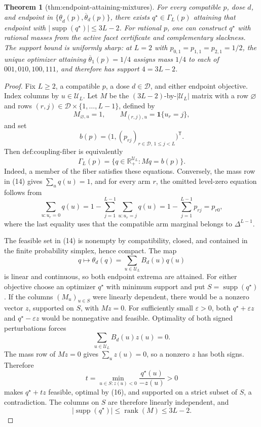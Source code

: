 \documentclass{article}
\newtheorem{theorem}{Theorem}
\begin{document}
\begin{theorem}[thm:endpoint-attaining-mixtures]\label{thm:endpoint-attaining-mixtures}
For every compatible \(p\), dose \(d\), and endpoint in \(\{\underline\theta_d(p),\overline\theta_d(p)\}\), there exists \(q^\star\in\Gamma_L(p)\) attaining that endpoint with \(|\operatorname{supp}(q^\star)|\le3L-2\). For rational \(p\), one can construct \(q^\star\) with rational masses from the active facet certificate and complementary slackness. The support bound is uniformly sharp: at \(L=2\) with \(p_{0,1}=p_{1,1}=p_{2,1}=1/2\), the unique optimizer attaining \(\overline\theta_1(p)=1/4\) assigns mass \(1/4\) to each of \(001,010,100,111\), and therefore has support \(4=3L-2\).
\end{theorem}
\begin{proof}
Fix \(L\geq2\), a compatible \(p\), a dose \(d\in\mathcal D\), and either endpoint objective.  Index columns by \(u\in\mathcal U_L\).  Let \(M\) be the \((3L-2)\)-by-\(|\mathcal U_L|\) matrix with a row \(\varnothing\) and rows \((r,j)\in\mathcal D\times\{1,\ldots,L-1\}\), defined by
\[
 M_{\varnothing,u}=1,
 \qquad
 M_{(r,j),u}=\mathbf 1\{u_r=j\},
\]
and set
\[
 b(p)=\bigl(1,(p_{rj})_{r\in\mathcal D,\,1\leq j<L}\bigr)^{\mathsf T}.
\]
Then \(\text{def:coupling-fiber}\) is equivalently
\[
 \Gamma_L(p)=\{q\in\mathbb R_+^{\mathcal U_L}:Mq=b(p)\}.                    \tag{14}
\]
Indeed, a member of the fiber satisfies these equations.  Conversely, the mass row in (14) gives \(\sum_uq(u)=1\), and for every arm \(r\), the omitted level-zero equation follows from
\[
 \sum_{u:u_r=0}q(u)
 =1-\sum_{j=1}^{L-1}\sum_{u:u_r=j}q(u)
 =1-\sum_{j=1}^{L-1}p_{rj}=p_{r0},                                         \tag{15}
\]
where the last equality uses that the compatible arm marginal belongs to \(\Delta^{L-1}\).

The feasible set in (14) is nonempty by compatibility, closed, and contained in the finite probability simplex, hence compact.  The map
\[
 q\longmapsto\theta_d(q)=\sum_{u\in\mathcal U_L}B_d(u)q(u)
\]
is linear and continuous, so both endpoint extrema are attained.  For either objective choose an optimizer \(q^\star\) with minimum support and put \(S=\operatorname{supp}(q^\star)\).  If the columns \((M_u)_{u\in S}\) were linearly dependent, there would be a nonzero vector \(z\), supported on \(S\), with \(Mz=0\).  For sufficiently small \(\varepsilon>0\), both \(q^\star+\varepsilon z\) and \(q^\star-\varepsilon z\) would be nonnegative and feasible.  Optimality of both signed perturbations forces
\[
 \sum_{u\in\mathcal U_L}B_d(u)z(u)=0.                                      \tag{16}
\]
The mass row of \(Mz=0\) gives \(\sum_uz(u)=0\), so a nonzero \(z\) has both signs.  Therefore
\[
 t=\min_{u\in S:z(u)<0}\frac{q^\star(u)}{-z(u)}>0
\]
makes \(q^\star+tz\) feasible, optimal by (16), and supported on a strict subset of \(S\), a contradiction.  The columns on \(S\) are therefore linearly independent, and
\[
 |\operatorname{supp}(q^\star)|\leq\operatorname{rank}(M)\leq3L-2.          \tag{17}
\]


\end{proof}
\end{document}
